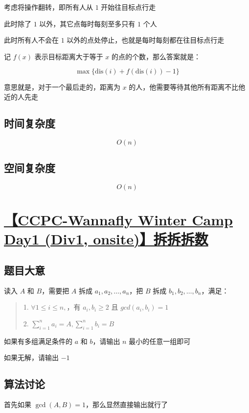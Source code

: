 \documentclass[UTF8]{article}
\begin{document}
考虑将操作翻转，即所有人从 $1$ 开始往目标点行走

此时除了 $1$ 以外，其它点每时每刻至多只有 $1$ 个人

此时所有人不会在 $1$ 以外的点处停止，也就是每时每刻都在往目标点行走

记 $f(x)$ 表示目标距离大于等于 $x$ 的点的个数，那么答案就是：

$$
\max\{\text{dis}(i)+f(\text{dis}(i))-1\}
$$

意思就是，对于一个最后走的，距离为 $x$ 的人，他需要等待其他所有距离不比他近的人先走

\subsection{时间复杂度}

$$
O(n)
$$

\subsection{空间复杂度}

$$
O(n)
$$

\section{\href{https://zhixincode.com/contest/2/problem/C?problem_id=25}{【CCPC-Wannafly Winter Camp Day1 (Div1, onsite)】拆拆拆数}}

\subsection{题目大意}

读入 $A$ 和 $B$，需要把 $A$ 拆成 $a_1, a_2, \dots, a_n$，把 $B$ 拆成 $b_1, b_2, \dots, b_n$，满足：

\begin{quotation}
1. $\forall 1 \leq i \leq n,$，有 $a_i, b_i \geq 2$ 且 $gcd(a_i, b_i) = 1$

2. $\sum_{i=1}^{n}{a_i} = A, \sum_{i=1}^{n}{b_i} = B$
\end{quotation}

如果有多组满足条件的 $a$ 和 $b$，请输出 $n$ 最小的任意一组即可

如果无解，请输出 $−1$

\subsection{算法讨论}

首先如果 $\gcd(A,B)=1$，那么显然直接输出就行了
\end{document}
